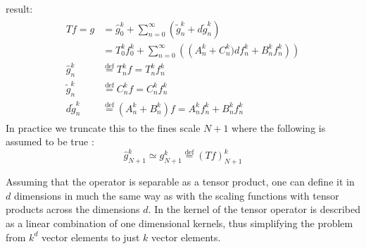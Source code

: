 \documentclass[../master_thesis.tex]{subfiles}
\begin{document}
result:
\begin{align}
  \begin{split}
    Tf = g &= \hat{g}^k_0 + \sum^\infty_{n=0}\left(\tilde{g}^k_n + d\tilde{g}^k_n\right)\\
       &= T^k_0f^k_0 +  \sum^\infty_{n=0}\left(\left(A_n^k + C_n^k)df^k_n + B^k_nf^k_n\right)\right)\\
       \hat{g}^k_n &\stackrel{\text{def}}{=} T^k_nf = T^k_nf^k_n\\
       \tilde{g}^k_n &\stackrel{\text{def}}{=} C^k_nf = C^k_nf^k_n\\
       d\tilde{g}^k_n &\stackrel{\text{def}}{=}\left(A^k_n + B^k_n\right)f = A^k_nf^k_n + B^k_nf^k_n
  \end{split}
\end{align}
In practice we truncate this to the fines scale $N+1$ where the following is assumed to be true \cite{Frediani:2013}:
\begin{equation}
  \hat{g}^k_{N+1} \simeq g^k_{N+1} \stackrel{\text{def}}{=} (Tf)^k_{N+1}
\end{equation}

Assuming that the operator is separable as a tensor product, one can define it in
$d$ dimensions in much the same way as with the scaling functions with tensor products
across the dimensions $d$. In \cite{Frediani:2013} the kernel of the tensor operator is
described as a linear combination of one dimensional kernels, thus simplifying the
problem from $k^d$ vector elements to just $k$ vector elements.


\biblio
\end{document}
